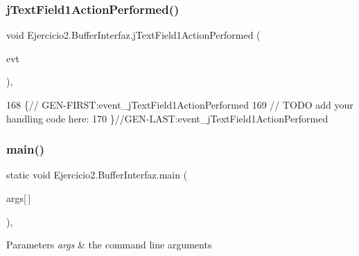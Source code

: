 \subsubsection{\texorpdfstring{j\+Text\+Field1\+Action\+Performed()}{jTextField1ActionPerformed()}}
{\footnotesize\ttfamily void Ejercicio2.\+Buffer\+Interfaz.\+j\+Text\+Field1\+Action\+Performed (\begin{DoxyParamCaption}\item[{java.\+awt.\+event.\+Action\+Event}]{evt }\end{DoxyParamCaption})\hspace{0.3cm}{\ttfamily [inline]}, {\ttfamily [private]}}


\begin{DoxyCode}
168                                                                             \{\textcolor{comment}{//
      GEN-FIRST:event\_jTextField1ActionPerformed}
169         \textcolor{comment}{// TODO add your handling code here:}
170     \}\textcolor{comment}{//GEN-LAST:event\_jTextField1ActionPerformed}
\end{DoxyCode}
\mbox{\label{class_ejercicio2_1_1_buffer_interfaz_a1ea4bdb4e29e185efd3ae018a11c0678}} 
\subsubsection{\texorpdfstring{main()}{main()}}
{\footnotesize\ttfamily static void Ejercicio2.\+Buffer\+Interfaz.\+main (\begin{DoxyParamCaption}\item[{String}]{args\mbox{[}$\,$\mbox{]} }\end{DoxyParamCaption})\hspace{0.3cm}{\ttfamily [inline]}, {\ttfamily [static]}}


\begin{DoxyParams}{Parameters}
{\em args} & the command line arguments \\
\hline
\end{DoxyParams}

